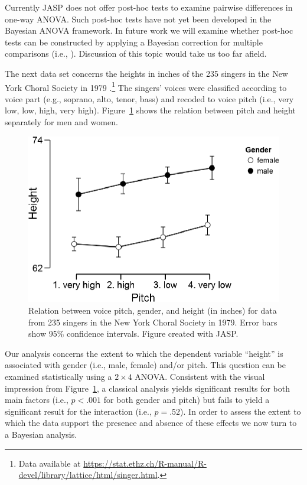 Currently JASP does not offer post-hoc tests to examine pairwise differences in one-way ANOVA. Such post-hoc tests have not yet been developed in the Bayesian ANOVA framework. In future work we will examine whether post-hoc tests can be constructed by applying a Bayesian correction for multiple comparisons (i.e., ). Discussion of this topic would take us too far afield.

The next data set concerns the heights in inches of the 235 singers in the New York Choral Society in 1979 \cite{ChambersEtAl1983}.\footnote{Data available at \url{https://stat.ethz.ch/R-manual/R-devel/library/lattice/html/singer.html}.} The singers' voices were classified according to voice part (e.g., soprano, alto, tenor, bass) and recoded to voice pitch (i.e., very low, low, high, very high). Figure~\ref{fig:bi2:DataSingers} shows the relation between pitch and height separately for men and women.

\begin{figure}[tp]
    \begin{center}
        \includegraphics[width=.75\textwidth]{figs/bi2_DataSingers.eps}
        \caption{Relation between voice pitch, gender, and height (in inches) for data from 235 singers in the New York Choral Society in 1979. Error bars show 95\% confidence intervals. Figure created with JASP.}%
         \label{fig:bi2:DataSingers}
    \end{center}
\end{figure}

Our analysis concerns the extent to which the dependent variable ``height'' is associated with gender (i.e., male, female) and/or pitch. This question can be examined statistically using a $2\times4$ ANOVA. Consistent with the visual impression from Figure~\ref{fig:bi2:DataSingers}, a classical analysis yields significant results for both main factors (i.e., $p<.001$ for both gender and pitch) but fails to yield a significant result for the interaction (i.e., $p=.52$). In order to assess the extent to which the data support the presence and absence of these effects we now turn to a Bayesian analysis.

